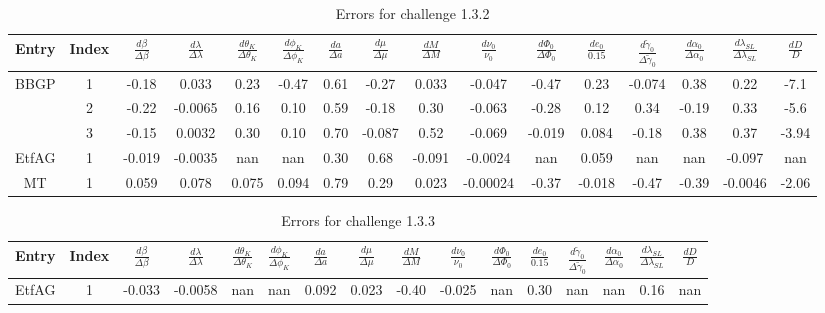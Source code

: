 \documentclass[prd,aps,amsfonts,amsmath, nofootinbib]{revtex4}
\begin{document}
\begin{table}
\caption{\label{EMRI_err} Errors for challenge 1.3.2}
\begin{ruledtabular}
\begin{tabular}{|c|c|c|c|c|c|c|c|c|c|c|c|c|c|c|c|}
Entry & Index & $\frac{d\beta}{\Delta\beta}$ & 
$\frac{d\lambda}{\Delta\lambda}$ &
 $\frac{d\theta_K}{\Delta\theta_K}$ & $\frac{d\phi_K}{\Delta\phi_K}$ 
 & $\frac{da}{\Delta a}$ & $\frac{d\mu}{\Delta\mu}$ & 
 $\frac{dM}{\Delta M}$ &  $\frac{d\nu_0}{\nu_0}$ & 
 $\frac{d\Phi_0}{\Delta\Phi_0}$ &  $\frac{de_0}{0.15}$ & 
 $\frac{d\tilde{\gamma}_0}{\Delta\tilde{\gamma}_0}$ &
 $\frac{d\alpha_0}{\Delta\alpha_0}$ & 
 $\frac{d\lambda_{SL}}{\Delta\lambda_{SL}}$ &
  $\frac{dD}{D}$ \\ 
\hline
BBGP & 1 &
 -0.18   &    0.033   &   0.23   &   -0.47   &   0.61   &   -0.27   &   0.033   &   -0.047   &   -0.47   &   0.23   &   -0.074   &   0.38   &   0.22   &   -7.1  \\   
   & 2 &
 -0.22   &   -0.0065   &   0.16   &   0.10   &   0.59   &   -0.18   &   0.30   &   -0.063   &   -0.28   &   0.12   &    0.34   &   -0.19   &   0.33   &   -5.6   \\
  & 3 & 
-0.15   &   0.0032   &   0.30   &   0.10   &   0.70   &   -0.087   &   0.52   &   -0.069  &   -0.019   &   0.084   &   -0.18   &   0.38   &   0.37   &   -3.94   \\
\hline
EtfAG &  1&
 -0.019   &   -0.0035  &   nan   &   nan   &   0.30   &   
 0.68   &   -0.091   &   -0.0024   &   nan   &   0.059   &   nan   &   nan   &   -0.097   &   nan   \\
 \hline
 MT &  1 & 
0.059   &    0.078   &   0.075   &   0.094   &   0.79   &   0.29   &   0.023   &   -0.00024   &   -0.37   &   -0.018   &   -0.47   &    -0.39   &   -0.0046   &   -2.06   \\
\hline
\end{tabular}
\end{ruledtabular}
\end{table}

\begin{table}
\caption{\label{EMRI_err} Errors for challenge 1.3.3}
\begin{ruledtabular}
\begin{tabular}{|c|c|c|c|c|c|c|c|c|c|c|c|c|c|c|c|}
Entry & Index & $\frac{d\beta}{\Delta\beta}$ & 
$\frac{d\lambda}{\Delta\lambda}$ &
 $\frac{d\theta_K}{\Delta\theta_K}$ & $\frac{d\phi_K}{\Delta\phi_K}$ 
 & $\frac{da}{\Delta a}$ & $\frac{d\mu}{\Delta\mu}$ & 
 $\frac{dM}{\Delta M}$ &  $\frac{d\nu_0}{\nu_0}$ & 
 $\frac{d\Phi_0}{\Delta\Phi_0}$ &  $\frac{de_0}{0.15}$ & 
 $\frac{d\tilde{\gamma}_0}{\Delta\tilde{\gamma}_0}$ &
 $\frac{d\alpha_0}{\Delta\alpha_0}$ & 
 $\frac{d\lambda_{SL}}{\Delta\lambda_{SL}}$ &
  $\frac{dD}{D}$ \\ 
\hline
EtfAG & 1 &
 -0.033   &   -0.0058   &   nan   &   nan   &   0.092  &   0.023 &  
 -0.40   &   -0.025   &   nan   &   0.30  &   nan   &   nan   &   0.16
  &   nan \\
  \hline
\end{tabular}
\end{ruledtabular}
\end{table}
\end{document}

